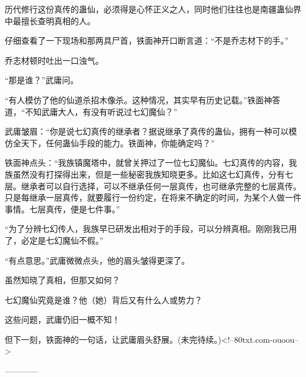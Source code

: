 \begin{this_body}
历代修行这份真传的蛊仙，必须得是心怀正义之人，同时他们往往也是南疆蛊仙界中最擅长查明真相的人。

仔细查看了一下现场和那两具尸首，铁面神开口断言道：“不是乔志材下的手。”

乔志材顿时吐出一口浊气。

“那是谁？”武庸问。

“有人模仿了他的仙道杀招木像杀。这种情况，其实早有历史记载。”铁面神答道，“不知武庸大人，有没有听说过七幻魔仙？”

武庸皱眉：“你是说七幻真传的继承者？据说继承了真传的蛊仙，拥有一种可以模仿全天下，任何蛊仙手段的能力。铁面神，你能确定吗？”

铁面神点头：“我族镇魔塔中，就曾关押过了一位七幻魔仙。七幻真传的内容，我族虽然没有打探得出来，但是一些秘密我族知晓更多。比如这七幻真传，分有七层。继承者可以自行选择，可以不继承任何一层真传，也可继承完整的七层真传。只是每继承一层真传，就要履行一份约定，在将来不确定的时间，为某个人做一件事情。七层真传，便是七件事。”

“为了分辨七幻传人，我族早已研发出相对于的手段，可以分辨真相。刚刚我已用了，必定是七幻魔仙不假。”

“有点意思。”武庸微微点头，他的眉头皱得更深了。

虽然知晓了真相，但那又如何？

七幻魔仙究竟是谁？他（她）背后又有什么人或势力？

这些问题，武庸仍旧一概不知！

但下一刻，铁面神的一句话，让武庸眉头舒展。(未完待续。)<!--80txt.com-ouoou-->

------------

\end{this_body}

